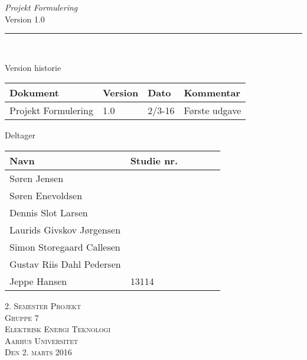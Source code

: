 \thispagestyle{empty}
\begin{flushright}
\vspace{3cm}

\phantom{hul}

\phantom{hul}

\phantom{hul}

\textsl{\Huge Projekt Formulering} \\ %
Version 1.0

\rule{16cm}{3mm} \\ \vspace{1.5cm}
\vspace{1cm}


\begin{table}[H] 
\flushleft
Version historie \\
	\begin{tabular}{|l|l|l|l|} %
		
																			 \hline
		Dokument				& Version   & Dato   	& Kommentar 	 \\ \hline 	%
		Projekt Formulering 	& 1.0   	& 2/3-16 	& Første udgave	 \\ \hline 
		
	\end{tabular} 
\end{table}

\begin{table}[H] 
	\flushleft
\phantom{hul}

\phantom{hul}
	Deltager
	
	\begin{tabular}{|l|l|l|l|l|l|} %
		\hline 	%
		Navn						&Studie nr.	\\ \hline 	%
		Søren Jensen	 			& 		   		\\ \hline 
		Søren Enevoldsen 			&				\\ \hline
		Dennis Slot Larsen			&				\\ \hline
		Laurids Givskov Jørgensen	&				\\ \hline
		Simon Storegaard Callesen	&				\\ \hline
		Gustav Riis Dahl Pedersen	&				\\ \hline
		Jeppe Hansen				&13114			\\ \hline
		
	\end{tabular} 
\end{table}




\vspace{2cm} 
\textsc{\Large 2. Semester Projekt \\
Gruppe 7 \\
Elektrisk Energi Teknologi \\
Aarhus Universitet \\
Den 2. marts 2016 \\}
\end{flushright}